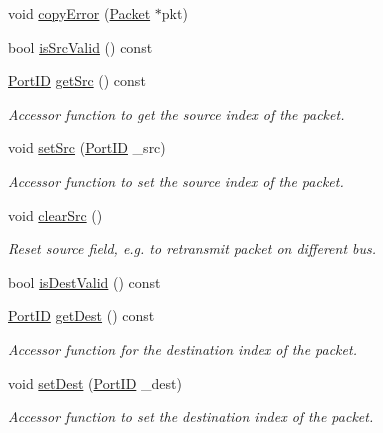 \begin{DoxyCompactItemize}
\item 
void \hyperlink{classPacket_a838dc8f424eaa81aa7ee30fb4c5900a0}{copyError} (\hyperlink{classPacket}{Packet} $\ast$pkt)
\item 
bool \hyperlink{classPacket_a298fc6cc50f34dc7eaee82b746129eb3}{isSrcValid} () const 
\item 
\hyperlink{base_2types_8hh_acef4d7d41cb21fdc252e20c04cd7bb8e}{PortID} \hyperlink{classPacket_a6ac1bab8f0db56da42ee3359c3aef5dc}{getSrc} () const 
\begin{DoxyCompactList}\small\item\em Accessor function to get the source index of the packet. \item\end{DoxyCompactList}\item 
void \hyperlink{classPacket_a6e173cf473a751a0e969c1561a4184cc}{setSrc} (\hyperlink{base_2types_8hh_acef4d7d41cb21fdc252e20c04cd7bb8e}{PortID} \_\-src)
\begin{DoxyCompactList}\small\item\em Accessor function to set the source index of the packet. \item\end{DoxyCompactList}\item 
void \hyperlink{classPacket_a65f22eb305e0e75fe1c4e484f046c00e}{clearSrc} ()
\begin{DoxyCompactList}\small\item\em Reset source field, e.g. to retransmit packet on different bus. \item\end{DoxyCompactList}\item 
bool \hyperlink{classPacket_a1a0afe1ec029c745df5d36293d306800}{isDestValid} () const 
\item 
\hyperlink{base_2types_8hh_acef4d7d41cb21fdc252e20c04cd7bb8e}{PortID} \hyperlink{classPacket_a8c4564a96830dffcc13f56b716afa674}{getDest} () const 
\begin{DoxyCompactList}\small\item\em Accessor function for the destination index of the packet. \item\end{DoxyCompactList}\item 
void \hyperlink{classPacket_a20739d8f669d352681830025686158ce}{setDest} (\hyperlink{base_2types_8hh_acef4d7d41cb21fdc252e20c04cd7bb8e}{PortID} \_\-dest)
\begin{DoxyCompactList}\small\item\em Accessor function to set the destination index of the packet. \item\end{DoxyCompactList}\item 

\end{DoxyCompactItemize}
